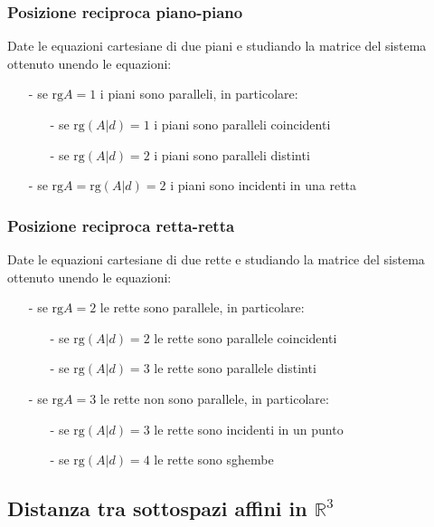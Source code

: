 \documentclass[a4paper]{article}
\newcommand\rg{\text{rg}} 		%
\begin{document}
\subsubsection*{Posizione reciproca piano-piano}
Date le equazioni cartesiane di due piani e studiando la matrice del sistema ottenuto unendo le equazioni:
\begin{itemize}[topsep=3pt, itemsep=0pt]
	\item[-] se \(\rg A = 1\) i piani sono paralleli, in particolare:
	\begin{itemize}[topsep=3pt, itemsep=0pt]
		\item[-] se \(\rg (A|d) = 1\) i piani sono paralleli coincidenti
		\item[-] se \(\rg (A|d) = 2\) i piani sono paralleli distinti
	\end{itemize}
	\item[-] se \(\rg A = \rg (A|d) = 2\) i piani sono incidenti in una retta
\end{itemize}

\subsubsection*{Posizione reciproca retta-retta}
Date le equazioni cartesiane di due rette e studiando la matrice del sistema ottenuto unendo le equazioni:
\begin{itemize}[topsep=3pt, itemsep=0pt]
	\item[-] se \(\rg A = 2\) le rette sono parallele, in particolare:
	\begin{itemize}[topsep=3pt, itemsep=0pt]
		\item[-] se \(\rg (A|d) = 2\) le rette sono parallele coincidenti
		\item[-] se \(\rg (A|d) = 3\) le rette sono parallele distinti
	\end{itemize}
	\item[-] se \(\rg A = 3\) le rette non sono parallele, in particolare:
	\begin{itemize}[topsep=3pt, itemsep=0pt]
		\item[-] se \(\rg (A|d) = 3\) le rette sono incidenti in un punto
		\item[-] se \(\rg (A|d) = 4\) le rette sono sghembe
	\end{itemize}
\end{itemize}

\newpage

\subsection{Distanza tra sottospazi affini in \(\mathbb{R}^3\)}
\end{document}
